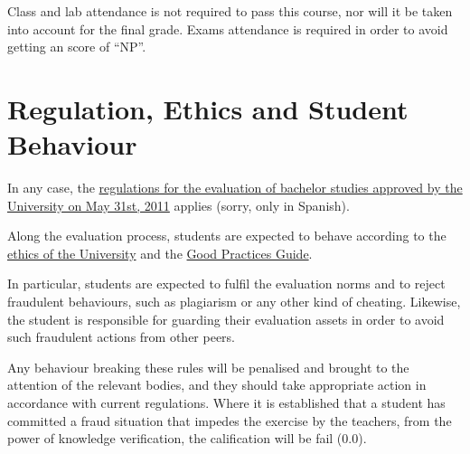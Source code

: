 \documentclass[11pt, a4paper, twoside]{article}
\begin{document}
Class and lab attendance is not required to pass this course, nor will it be
taken into account for the final grade. Exams attendance is required in order to avoid getting an score of ``NP''.

\section{Regulation, Ethics and Student Behaviour}

In any case, the
\href{http://www.uc3m.es/portal/page/portal/organizacion/secret_general/normativa/estudiantes/estudios_grado/normativa-evaluacion-continua-31-05-11_FINALx.pdf}{regulations
for the evaluation of bachelor studies approved by the University on May 31st,
2011} applies (sorry, only in Spanish).

Along the evaluation process, students are expected to behave according to the
\href{http://www.uc3m.es/portal/page/portal/conocenos/nuestros_estudios/grados/tu_compromiso_universidad}{ethics
of the University} and the
\href{http://www.uc3m.es/ss/Satellite/UC3MInstitucional/en/TextoMixta/1371206782958/Guia_de_las_buenas_practicas}{Good
Practices Guide}.

In particular, students are expected to fulfil the evaluation norms and to
reject fraudulent behaviours, such as plagiarism or any other kind of cheating.
Likewise, the student is responsible for guarding their evaluation assets in
order to avoid such fraudulent actions from other peers.

Any behaviour breaking these rules will be penalised and brought to the
attention of the relevant bodies, and they should take appropriate action
in accordance with current regulations. Where it is established that a student
has committed a fraud situation that impedes the exercise by the teachers, from
the power of knowledge verification, the calification will be fail (0.0).
\end{document}
